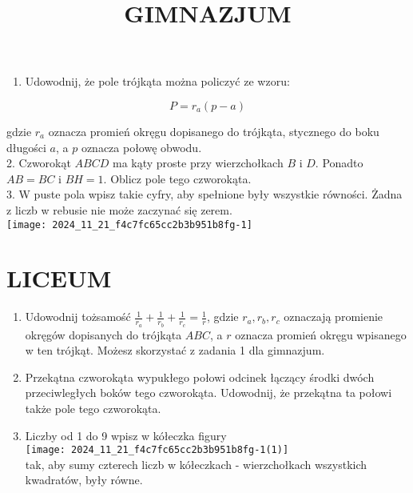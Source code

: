 \documentclass[10pt]{article}
\title{GIMNAZJUM }
\author{}
\date{}
\begin{document}
\maketitle
\begin{enumerate}
  \item Udowodnij, że pole trójkąta można policzyć ze wzoru:
\end{enumerate}

\[
P=r_{a}(p-a)
\]

gdzie \(r_{a}\) oznacza promień okręgu dopisanego do trójkąta, stycznego do boku długości \(a\), a \(p\) oznacza połowę obwodu.\\
2. Czworokąt \(A B C D\) ma kąty proste przy wierzchołkach \(B\) i \(D\). Ponadto \(A B=B C\) i \(B H=1\). Oblicz pole tego czworokąta.\\
3. W puste pola wpisz takie cyfry, aby spełnione były wszystkie równości. Żadna z liczb w rebusie nie może zaczynać się zerem.\\
\texttt{[image: 2024\_11\_21\_f4c7fc65cc2b3b951b8fg-1]}

\section*{LICEUM}
\begin{enumerate}
  \item Udowodnij tożsamość \(\frac{1}{r_{a}}+\frac{1}{r_{b}}+\frac{1}{r_{c}}=\frac{1}{r}\), gdzie \(r_{a}, r_{b}, r_{c}\) oznaczają promienie okręgów dopisanych do trójkąta \(A B C\), a \(r\) oznacza promień okręgu wpisanego w ten trójkąt. Możesz skorzystać z zadania 1 dla gimnazjum.
  \item Przekątna czworokąta wypukłego połowi odcinek łączący środki dwóch przeciwległych boków tego czworokąta. Udowodnij, że przekątna ta połowi także pole tego czworokąta.
  \item Liczby od 1 do 9 wpisz w kółeczka figury\\
\texttt{[image: 2024\_11\_21\_f4c7fc65cc2b3b951b8fg-1(1)]}\\
tak, aby sumy czterech liczb w kółeczkach - wierzchołkach wszystkich kwadratów, były równe.
\end{enumerate}
\end{document}
